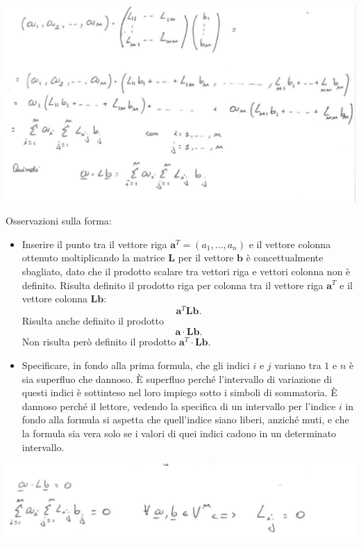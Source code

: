\documentclass[12pt]{article}
\begin{document}
\includegraphics[width=\linewidth]{capture2.png}

Osservazioni sulla forma:
\begin{itemize}
\item Inserire il punto tra il vettore riga $\mathbf a^T=(a_1,\ldots,a_n)$ e il vettore colonna ottenuto moltiplicando la matrice $\mathbf L$ per il vettore $\mathbf b$ \`e concettualmente sbagliato, dato che  il prodotto scalare tra vettori riga e vettori colonna non \`e definito. Risulta definito il prodotto riga per colonna tra il vettore riga $\mathbf a^T$ e il vettore colonna $\mathbf L\mathbf b$:
\begin{equation}
  \mathbf a^T\mathbf L\mathbf b.
\end{equation}
Risulta anche definito il prodotto
\begin{equation}
  \mathbf a\cdot\mathbf L\mathbf b.
\end{equation}
Non risulta per\`o definito il prodotto $\mathbf a^T\cdot\mathbf L\mathbf b$.

\item Specificare, in fondo alla prima formula, che gli indici $i$ e $j$ variano tra $1$ e $n$ \`e sia superfluo che dannoso. \`E superfluo perch\'e l'intervallo di variazione di questi indici \`e sottinteso nel loro impiego sotto i simboli di sommatoria. \`E dannoso perch\'e il lettore, vedendo la specifica di un intervallo per l'indice $i$ in fondo alla formula si aspetta che quell'indice siano liberi, anzich\'e muti, e che la formula sia vera solo se i valori di quei indici cadono in un determinato intervallo.

\end{itemize}


\includegraphics[width=\linewidth]{capture3.png}
\end{document}
